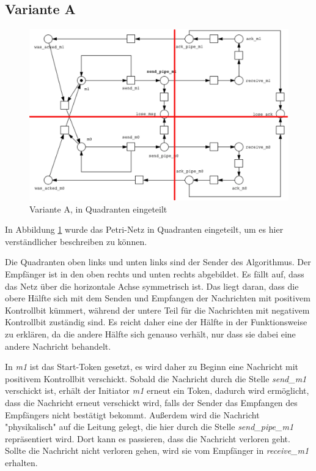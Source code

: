 \documentclass[]{scrartcl}
\begin{document}
\subsection{Variante A}
\begin{figure}[H]
	\centering
	\includegraphics[width=1\linewidth]{petrinet_grid.png}
	\caption{Variante A, in Quadranten eingeteilt}
	\label{fig:petri_net_A_withgrid}
\end{figure}
In Abbildung \ref{fig:petri_net_A_withgrid} wurde das Petri-Netz in Quadranten eingeteilt, um es hier verständlicher beschreiben zu können.

Die Quadranten oben links und unten links sind der Sender des Algorithmus. Der Empfänger ist in den oben rechts und unten rechts abgebildet. Es fällt auf, dass das Netz über die horizontale Achse symmetrisch ist. Das liegt daran, dass die obere Hälfte sich mit dem Senden und Empfangen der Nachrichten mit positivem Kontrollbit kümmert, während der untere Teil für die Nachrichten mit negativem Kontrollbit zuständig sind. Es reicht daher eine der Hälfte in der Funktionsweise zu erklären, da die andere Hälfte sich genauso verhält, nur dass sie dabei eine andere Nachricht behandelt.

In \textit{m1} ist das Start-Token gesetzt, es wird daher zu Beginn eine Nachricht mit positivem Kontrollbit verschickt. Sobald die Nachricht durch die Stelle \textit{send\_m1} verschickt ist, erhält der Initiator \textit{m1} erneut ein Token, dadurch wird ermöglicht, dass die Nachricht erneut verschickt wird, falls der Sender das Empfangen des Empfängers nicht bestätigt bekommt. Außerdem wird die Nachricht "physikalisch" auf die Leitung gelegt, die hier durch die Stelle \textit{send\_pipe\_m1} repräsentiert wird. Dort kann es passieren, dass die Nachricht verloren geht. Sollte die Nachricht nicht verloren gehen, wird sie vom Empfänger in \textit{receive\_m1} erhalten.
\end{document}
